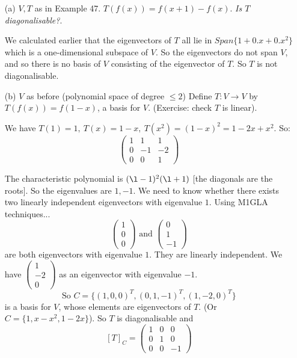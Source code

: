 \documentclass[10pt]{scrartcl}
\begin{document}
\begin{examples}\begin{itemize}
\item[(a)] $V,T$ as in Example 47. $T(f(x)) = f(x+1) - f(x)$. \emph{Is $T$ diagonalisable?}.
 
We calculated earlier that the eigenvectors of $T$ all lie in $Span\{1 + 0.x + 0.x^2\}$ which is a one-dimensional subspace of $V$. So the eigenvectors do not span $V$, and so there is no basis of $V$ consisting of the eigenvector of $T$. So $T$ is not diagonalisable. 

\item[(b)] $V$ as before (polynomial space of degree $\leq 2$)
Define $T: V\to V$ by $T(f(x)) = f(1-x)$, a basis for $V$. (Exercise: check $T$ is linear).

 We have $T(1) = 1,~ T(x) = 1-x,~ T(x^2) = (1-x)^2 = 1-2x + x^2.$ So:
\[
\begin{pmatrix}
1 & 1 & 1 \\ 0 & -1 & -2 \\ 0 & 0 & 1
\end{pmatrix}
\]

The characteristic polynomial is $(\l-1)^2(\l+1)$ [the diagonals are the roots]. So the eigenvalues are $1,-1.$ We need to know whether there exists two linearly independent eigenvectors with eigenvalue $1$. Using M1GLA techniques...
\[
\left(\begin{smallmatrix}
1 \\ 0 \\0
\end{smallmatrix} \right) \text{ and } \left(\begin{smallmatrix}
0 \\ 1 \\-1
\end{smallmatrix} \right)\]
are both eigenvectors with eigenvalue $1$. They are linearly independent. We have $\left(\begin{smallmatrix}
1 \\ -2 \\0
\end{smallmatrix} \right)
$ as an eigenvector with eigenvalue $-1$.
\[\text{So } C = \{(1,0,0)^T,(0,1,-1)^T,(1,-2,0)^T\}\] is a basis for $V$, whose elements are eigenvectors of $T.$ (Or $C = \{1, x-x^2,1-2x\}$). So $T$ is diagonalisable and \[[T]_C = \begin{pmatrix}
 1 & 0 & 0 \\ 0 & 1 & 0 \\ 0 & 0 & -1
 \end{pmatrix}\]
 \end{itemize}
 \end{examples}
 
\end{document}
